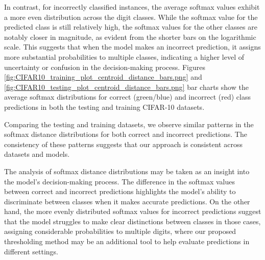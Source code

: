 In contrast, for incorrectly classified instances, the average softmax values exhibit a more even distribution across the digit classes. While the softmax value for the predicted class is still relatively high, the softmax values for the other classes are notably closer in magnitude, as evident from the shorter bars on the logarithmic scale. This suggests that when the model makes an incorrect prediction, it assigns more substantial probabilities to multiple classes, indicating a higher level of uncertainty or confusion in the decision-making process.
Figures \ref{fig:CIFAR10_training_plot_centroid_distance_bars.png} and \ref{fig:CIFAR10_testing_plot_centroid_distance_bars.png} bar charts show the average softmax distributions for correct (green/blue) and incorrect (red) class predictions in both the testing and training CIFAR-10 datasets.

Comparing the testing and training datasets, we observe similar patterns in the softmax distance distributions for both correct and incorrect predictions. The consistency of these patterns suggests that our approach is consistent across datasets and models. 

The analysis of softmax distance distributions may be taken as an insight into the model's decision-making process. The difference in the softmax values between correct and incorrect predictions highlights the model's ability to discriminate between classes when it makes accurate predictions. On the other hand, the more evenly distributed softmax values for incorrect predictions suggest that the model struggles to make clear distinctions between classes in those cases, assigning considerable probabilities to multiple digits, where our proposed thresholding method may be an additional tool to help evaluate predictions in different settings.
